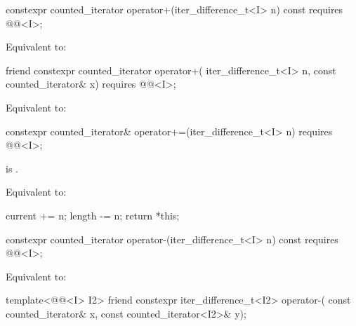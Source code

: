 %
\begin{itemdecl}
constexpr counted_iterator operator+(iter_difference_t<I> n) const
  requires @@<I>;
\end{itemdecl}

\begin{itemdescr}
\pnum
\effects
Equivalent to: 
\end{itemdescr}

%
\begin{itemdecl}
friend constexpr counted_iterator operator+(
  iter_difference_t<I> n, const counted_iterator& x)
    requires @@<I>;
\end{itemdecl}

\begin{itemdescr}
\pnum
\effects
Equivalent to: 
\end{itemdescr}

%
\begin{itemdecl}
constexpr counted_iterator& operator+=(iter_difference_t<I> n)
  requires @@<I>;
\end{itemdecl}

\begin{itemdescr}
\pnum
\hardexpects
{} is .

\pnum
\effects
Equivalent to:
\begin{codeblock}
current += n;
length -= n;
return *this;
\end{codeblock}
\end{itemdescr}

%
\begin{itemdecl}
constexpr counted_iterator operator-(iter_difference_t<I> n) const
  requires @@<I>;
\end{itemdecl}

\begin{itemdescr}
\pnum
\effects
Equivalent to: 
\end{itemdescr}

%
\begin{itemdecl}
template<@@<I> I2>
  friend constexpr iter_difference_t<I2> operator-(
    const counted_iterator& x, const counted_iterator<I2>& y);
\end{itemdecl}

